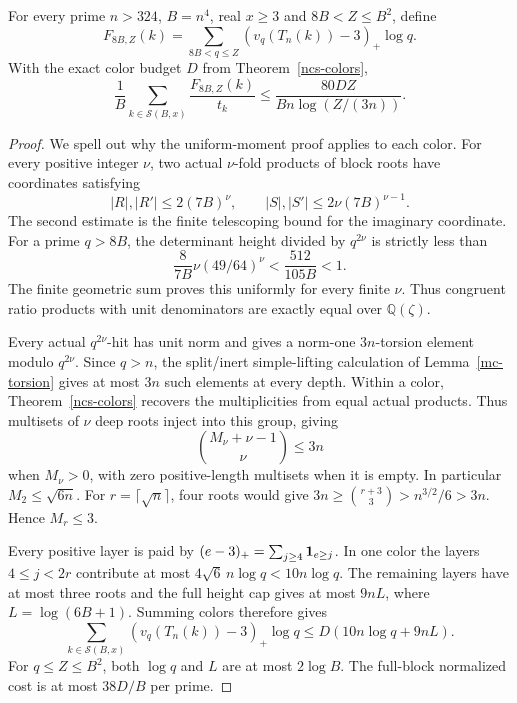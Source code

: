 \begin{theorem}
\label{ncs-eighty}
For every prime \(n>324\), \(B=n^4\), real \(x\geq3\) and
\(8B<Z\leq B^2\), define
\[
 F_{8B,Z}(k)=\sum_{8B<q\leq Z}(v_q(T_n(k))-3)_+\log q.
\]
With the exact color budget \(D\) from Theorem~\ref{ncs-colors},
\begin{equation}\label{ncs-mean-finite}
 \frac1B\sum_{k\in\mathcal S(B,x)}\frac{F_{8B,Z}(k)}{t_k}
 \leq\frac{80DZ}{Bn\log(Z/(3n))}.
\end{equation}
\end{theorem}
\begin{proof}
We spell out why the uniform-moment proof applies to each color.
For every positive integer \(\nu\), two actual \(\nu\)-fold
products of block roots have coordinates satisfying
\[
 |R|,|R'|\leq2(7B)^\nu,\qquad
 |S|,|S'|\leq2\nu(7B)^{\nu-1}.
\]
The second estimate is the finite telescoping bound for the
imaginary coordinate. For a prime \(q>8B\), the determinant
height divided by \(q^{2\nu}\) is strictly less than
\[
 \frac8{7B}\nu(49/64)^\nu
 <\frac{512}{105B}<1.
\]
The finite geometric sum proves this uniformly for every finite
\(\nu\). Thus congruent ratio products with unit denominators
are exactly equal over \(\mathbb Q(\zeta)\).

Every actual \(q^{2\nu}\)-hit has unit norm and gives a norm-one
\(3n\)-torsion element modulo \(q^{2\nu}\). Since \(q>n\), the
split/inert simple-lifting calculation of Lemma~\ref{mc-torsion}
gives at most \(3n\) such elements at every depth. Within a color,
Theorem~\ref{ncs-colors} recovers the multiplicities from equal
actual products. Thus multisets of \(\nu\) deep roots inject into
this group, giving
\[
 \binom{M_\nu+\nu-1}{\nu}\leq3n
\]
when \(M_\nu>0\), with zero positive-length multisets when it is
empty. In particular \(M_2\leq\sqrt{6n}\). For
\(r=\lceil\sqrt n\rceil\), four roots would give
\(3n\geq\binom{r+3}3>n^{3/2}/6>3n\). Hence \(M_r\leq3\).

Every positive layer is paid by
\((e-3)_+=\sum_{j\geq4}{\bf1}_{e\geq j}\).
In one color the layers \(4\leq j<2r\) contribute at most
\(4\sqrt6\,n\log q<10n\log q\). The remaining layers have at
most three roots and the full height cap gives at most \(9nL\),
where \(L=\log(6B+1)\). Summing colors therefore gives
\[
 \sum_{k\in\mathcal S(B,x)}(v_q(T_n(k))-3)_+\log q
                  \leq D(10n\log q+9nL).
\]
For \(q\leq Z\leq B^2\), both \(\log q\) and \(L\) are at
most \(2\log B\). The full-block normalized cost is at most
\(38D/B\) per prime.


\end{proof}
